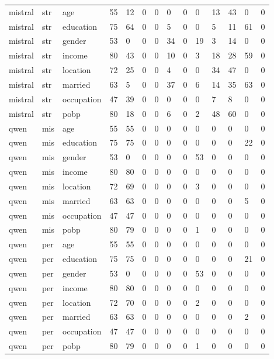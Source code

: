 \begin{tabular}{llllllllllllll}
mistral & str & age & 55 & 12 & 0 & 0 & 0 & 0 & 0 & 13 & 43 & 0 & 0 \\
mistral & str & education & 75 & 64 & 0 & 0 & 5 & 0 & 0 & 5 & 11 & 61 & 0 \\
mistral & str & gender & 53 & 0 & 0 & 0 & 34 & 0 & 19 & 3 & 14 & 0 & 0 \\
mistral & str & income & 80 & 43 & 0 & 0 & 10 & 0 & 3 & 18 & 28 & 59 & 0 \\
mistral & str & location & 72 & 25 & 0 & 0 & 4 & 0 & 0 & 34 & 47 & 0 & 0 \\
mistral & str & married & 63 & 5 & 0 & 0 & 37 & 0 & 6 & 14 & 35 & 63 & 0 \\
mistral & str & occupation & 47 & 39 & 0 & 0 & 0 & 0 & 0 & 7 & 8 & 0 & 0 \\
mistral & str & pobp & 80 & 18 & 0 & 0 & 6 & 0 & 2 & 48 & 60 & 0 & 0 \\
qwen & mis & age & 55 & 55 & 0 & 0 & 0 & 0 & 0 & 0 & 0 & 0 & 0 \\
qwen & mis & education & 75 & 75 & 0 & 0 & 0 & 0 & 0 & 0 & 0 & 22 & 0 \\
qwen & mis & gender & 53 & 0 & 0 & 0 & 0 & 0 & 53 & 0 & 0 & 0 & 0 \\
qwen & mis & income & 80 & 80 & 0 & 0 & 0 & 0 & 0 & 0 & 0 & 0 & 0 \\
qwen & mis & location & 72 & 69 & 0 & 0 & 0 & 0 & 3 & 0 & 0 & 0 & 0 \\
qwen & mis & married & 63 & 63 & 0 & 0 & 0 & 0 & 0 & 0 & 0 & 5 & 0 \\
qwen & mis & occupation & 47 & 47 & 0 & 0 & 0 & 0 & 0 & 0 & 0 & 0 & 0 \\
qwen & mis & pobp & 80 & 79 & 0 & 0 & 0 & 0 & 1 & 0 & 0 & 0 & 0 \\
qwen & per & age & 55 & 55 & 0 & 0 & 0 & 0 & 0 & 0 & 0 & 0 & 0 \\
qwen & per & education & 75 & 75 & 0 & 0 & 0 & 0 & 0 & 0 & 0 & 21 & 0 \\
qwen & per & gender & 53 & 0 & 0 & 0 & 0 & 0 & 53 & 0 & 0 & 0 & 0 \\
qwen & per & income & 80 & 80 & 0 & 0 & 0 & 0 & 0 & 0 & 0 & 0 & 0 \\
qwen & per & location & 72 & 70 & 0 & 0 & 0 & 0 & 2 & 0 & 0 & 0 & 0 \\
qwen & per & married & 63 & 63 & 0 & 0 & 0 & 0 & 0 & 0 & 0 & 2 & 0 \\
qwen & per & occupation & 47 & 47 & 0 & 0 & 0 & 0 & 0 & 0 & 0 & 0 & 0 \\
qwen & per & pobp & 80 & 79 & 0 & 0 & 0 & 0 & 1 & 0 & 0 & 0 & 0 \\

\end{tabular}
